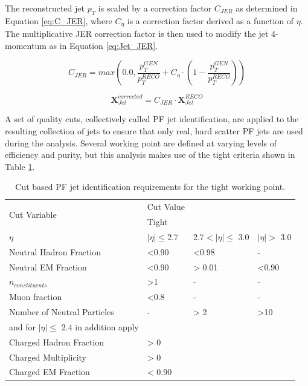 The reconstructed jet $p_{T}$ is scaled by a correction factor $C_{JER}$ as determined in Equation \ref{eq:C_JER}, where $C_{\eta}$ is a correction factor derived as a function of $\eta$. The multiplicative JER correction factor is then used to modify the jet 4-momentum as in Equation \ref{eq:Jet_JER}.

\begin{equation}
\label{eq:C_JER}
C_{JER}=max\left(0.0,\frac{p_{T}^{GEN}}{p_{T}^{RECO}}+C_{\eta}\cdot\left(1-\frac{p_{T}^{GEN}}{p_{T}^{RECO}}\right)\right)
\end{equation}

\begin{equation}
\label{eq:Jet_JER}
\textbf{X}_{Jet}^{corrected}=C_{JER}{\cdot}\textbf{X}_{Jet}^{RECO}
\end{equation}

A set of quality cuts, collectively called PF jet identification, are applied to the resulting collection of jets to ensure that only real, hard scatter PF jets are used during the analysis\cite{CMS-AN-2010-003}. Several working point are defined at varying levels of efficiency and purity, but this analysis makes use of the tight criteria shown in Table \ref{tab:PFJetID}\cite{PFJetID}.

\begin{table}[htbp]
    \caption{Cut based PF jet identification requirements for the tight working point.}
    \centering
    \begin{tabular}{llll}
        \hline
        \multirow{2}{*}{Cut Variable}               & Cut Value \\\cline{2-2}
                                                    & Tight\\ 
        \hline 
        $\eta$& $|\eta|\leq$2.7 &2.7$<|\eta|\leq$ 3.0  & $|\eta|>$ 3.0\\
        \hline 
        Neutral Hadron Fraction  & <0.90  & <0.98 & -\\  
        Neutral EM Fraction      & <0.90  & > 0.01 & <0.90\\
        $n_{constituents}$       & >1     & -      & - \\
        Muon fraction            & <0.8   & -      & -\\
        Number of Neutral Particles & - & > 2      & >10\\
        \hline
        and for $|\eta| \leq$ 2.4 in addition apply\\
        \hline
        Charged Hadron Fraction & > 0 \\
        Charged Multiplicity    & > 0 \\
        Charged EM Fraction     & < 0.90\\
        \hline 
    \end{tabular}
    \label{tab:PFJetID}
\end{table}

